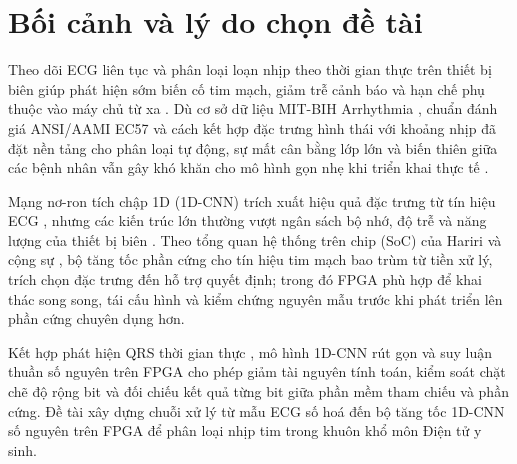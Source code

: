 \section{Bối cảnh và lý do chọn đề tài}\label{sec:boicanh}

Theo dõi ECG liên tục và phân loại loạn nhịp theo thời gian thực trên thiết bị biên giúp phát hiện sớm biến cố tim mạch, giảm trễ cảnh báo và hạn chế phụ thuộc vào máy chủ từ xa \cite{liu2025fpga1dcnn, liu2023fully}. Dù cơ sở dữ liệu MIT-BIH Arrhythmia \cite{moody2001impact}, chuẩn đánh giá ANSI/AAMI EC57 \cite{aami2012ec57} và cách kết hợp đặc trưng hình thái với khoảng nhịp \cite{dechazal2004automatic} đã đặt nền tảng cho phân loại tự động, sự mất cân bằng lớp lớn và biến thiên giữa các bệnh nhân vẫn gây khó khăn cho mô hình gọn nhẹ khi triển khai thực tế \cite{li2026lightweight, lin2017focal}.

Mạng nơ-ron tích chập 1D (1D-CNN) trích xuất hiệu quả đặc trưng từ tín hiệu ECG \cite{kiranyaz2016realtime}, nhưng các kiến trúc lớn thường vượt ngân sách bộ nhớ, độ trễ và năng lượng của thiết bị biên \cite{liu2025fpga1dcnn, li2026lightweight}. Theo tổng quan hệ thống trên chip (SoC) của Hariri và cộng sự \cite{hariri2026hardware}, bộ tăng tốc phần cứng cho tín hiệu tim mạch bao trùm từ tiền xử lý, trích chọn đặc trưng đến hỗ trợ quyết định; trong đó FPGA phù hợp để khai thác song song, tái cấu hình và kiểm chứng nguyên mẫu trước khi phát triển lên phần cứng chuyên dụng hơn.

Kết hợp phát hiện QRS thời gian thực \cite{pantompkins1985realtime}, mô hình 1D-CNN rút gọn \cite{liu2025fpga1dcnn, li2026lightweight} và suy luận thuần số nguyên \cite{jacob2018quantization} trên FPGA cho phép giảm tài nguyên tính toán, kiểm soát chặt chẽ độ rộng bit và đối chiếu kết quả từng bit giữa phần mềm tham chiếu và phần cứng. Đề tài xây dựng chuỗi xử lý từ mẫu ECG số hoá đến bộ tăng tốc 1D-CNN số nguyên trên FPGA để phân loại nhịp tim trong khuôn khổ môn Điện tử y sinh.
